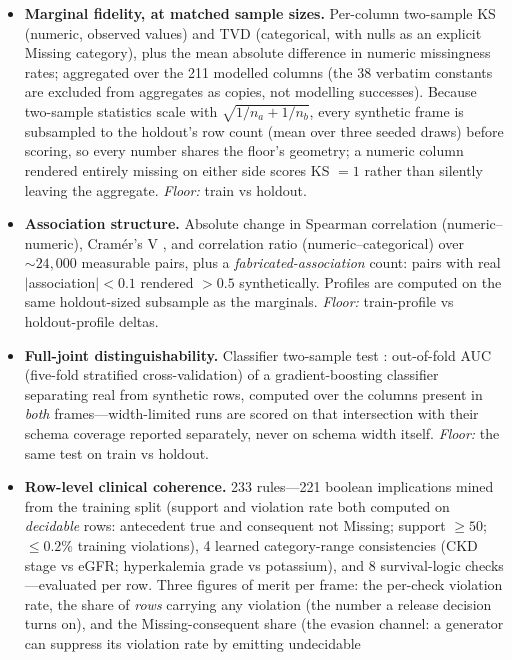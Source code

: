 \documentclass[11pt,a4paper]{article}
\begin{document}
\begin{itemize}
\item \textbf{Marginal fidelity, at matched sample sizes.} Per-column two-sample
KS (numeric, observed values) and TVD (categorical, with nulls as an explicit
Missing category), plus the mean absolute difference in numeric missingness rates;
aggregated over the 211 modelled columns (the 38 verbatim constants are excluded
from aggregates as copies, not modelling successes). Because two-sample statistics
scale with $\sqrt{1/n_a + 1/n_b}$, every synthetic frame is subsampled to the
holdout's row count (mean over three seeded draws) before scoring, so every number
shares the floor's geometry; a numeric column rendered entirely missing on either
side scores KS $= 1$ rather than silently leaving the aggregate. \emph{Floor:}
train vs holdout.
\item \textbf{Association structure.} Absolute change in Spearman correlation
(numeric--numeric), Cram\'er's V
\citep[categorical--categorical;][]{cramer1946mathematical}, and correlation ratio
(numeric--categorical) over ${\sim}24{,}000$ measurable pairs, plus a
\emph{fabricated-association} count: pairs with real $|$association$| < 0.1$
rendered $> 0.5$ synthetically. Profiles are computed on the same holdout-sized
subsample as the marginals. \emph{Floor:} train-profile vs holdout-profile deltas.
\item \textbf{Full-joint distinguishability.} Classifier two-sample test
\citep[C2ST;][]{lopezpaz2017revisiting}: out-of-fold AUC (five-fold stratified
cross-validation) of a gradient-boosting classifier separating real from synthetic
rows, computed over the columns present in \emph{both} frames---width-limited runs
are scored on that intersection with their schema coverage reported separately,
never on schema width itself. \emph{Floor:} the same test on train vs holdout.
\item \textbf{Row-level clinical coherence.} 233 rules---221 boolean implications
mined from the training split (support and violation rate both computed on
\emph{decidable} rows: antecedent true and consequent not Missing; support
$\geq 50$; $\leq 0.2\%$ training violations), 4 learned category-range
consistencies (CKD stage vs eGFR; hyperkalemia grade vs potassium), and 8
survival-logic checks---evaluated per row. Three figures of merit per frame: the
per-check violation rate, the share of \emph{rows} carrying any violation (the
number a release decision turns on), and the Missing-consequent share (the evasion
channel: a generator can suppress its violation rate by emitting undecidable

\end{itemize}
\end{document}
